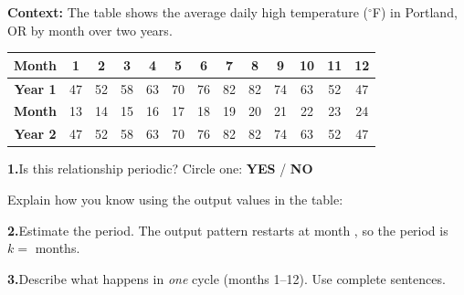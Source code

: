 \documentclass[10pt]{article}
\begin{document}
\begin{tcolorbox}[colback=white, colframe=black!40,
    title=\textbf{Tier R --- Reinforce},
    fonttitle=\bfseries, arc=2mm, left=3mm, right=3mm, top=2mm, bottom=2mm]

\textbf{Context:} The table shows the average daily high temperature
(${}^\circ$F) in Portland, OR by month over two years.

\vspace{4pt}
\begin{center}
\renewcommand{\arraystretch}{1.35}
\small
\begin{tabular}{|c|c|c|c|c|c|c|c|c|c|c|c|c|}
\hline
\textbf{Month} & 1 & 2 & 3 & 4 & 5 & 6 & 7 & 8 & 9 & 10 & 11 & 12 \\
\hline
\textbf{Year 1} & 47 & 52 & 58 & 63 & 70 & 76 & 82 & 82 & 74 & 63 & 52 & 47 \\
\hline
\textbf{Month} & 13 & 14 & 15 & 16 & 17 & 18 & 19 & 20 & 21 & 22 & 23 & 24 \\
\hline
\textbf{Year 2} & 47 & 52 & 58 & 63 & 70 & 76 & 82 & 82 & 74 & 63 & 52 & 47 \\
\hline
\end{tabular}
\end{center}

\vspace{6pt}
\textbf{1.}\quad Is this relationship periodic? Circle one: \quad \textbf{YES} \quad / \quad \textbf{NO}

\vspace{4pt}
Explain how you know using the output values in the table:

\vspace{4pt}
\textbf{2.}\quad Estimate the period. The output pattern restarts at month
\underline{\hspace{1.2cm}}, so the period is $k =$ \underline{\hspace{1.2cm}} months.

\vspace{4pt}
\textbf{3.}\quad Describe what happens in \emph{one} cycle (months 1--12).
Use complete sentences.


\end{tcolorbox}
\end{document}

